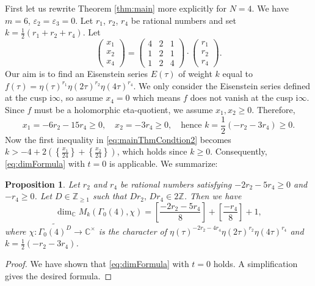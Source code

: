 \documentclass[12pt]{amsart}
\numberwithin{equation}{section}
\theoremstyle{plain}
\newtheorem{prop}[thm]{Proposition}
\theoremstyle{definition}
\theoremstyle{remark}
\newcommand\rmi{\mathrm{i}}
\newcommand\numZ{\mathbb{Z}}
\newcommand\numC{\mathbb{C}}
\newcommand\numgeq[2]{\mathbb{#1}_{\geq #2}}
\newcommand\Dcover[2]{\widetilde{#1^{#2}}}
\begin{document}
First let us rewrite Theorem \ref{thm:main} more explicitly for $N=4$. We have $m=6$, $\varepsilon_2=\varepsilon_3=0$. Let $r_1$, $r_2$, $r_4$ be rational numbers and set $k=\frac{1}{2}(r_1+r_2+r_4)$. Let
\begin{equation}
\label{eq:x1x2x4r1r2r4}
\begin{pmatrix}
x_1 \\ x_2 \\ x_4
\end{pmatrix}=
\begin{pmatrix}
4 & 2 & 1 \\
1 & 2 & 1\\
1 & 2 & 4
\end{pmatrix}\cdot
\begin{pmatrix}
r_1 \\ r_2 \\ r_4
\end{pmatrix}.
\end{equation}
Our aim is to find an Eisenstein series $E(\tau)$ of weight $k$ equal to $f(\tau)=\eta(\tau)^{r_1}\eta(2\tau)^{r_2}\eta(4\tau)^{r_4}$. We only consider the Eisenstein series defined at the cusp $\rmi\infty$, so assume $x_4=0$ which means $f$ does not vanish at the cusp $\rmi\infty$. Since $f$ must be a holomorphic eta-quotient, we assume $x_1,x_2\geq0$. Therefore,
\begin{equation*}
x_1=-6r_2-15r_4\geq0,\quad x_2=-3r_4\geq0,\quad\text{hence }k=\frac{1}{2}(-r_2-3r_4)\geq0.
\end{equation*}
Now the first inequality in \eqref{eq:mainThmCondtion2} becomes $k>-4+2\left(\left\{\frac{x_1}{24}\right\}+\left\{\frac{x_2}{24}\right\}\right)$, which holds since $k\geq0$. Consequently, \eqref{eq:dimFormula} with $t=0$ is applicable. We summarize:
\begin{prop}
\label{prop:level4x4zero}
Let $r_2$ and $r_4$ be rational numbers satisfying $-2r_2-5r_4\geq0$ and $-r_4\geq0$. Let $D\in\numgeq{Z}{1}$ such that $Dr_2,\,Dr_4\in2\numZ$. Then we have
\begin{equation*}
\dim_\numC M_k(\Gamma_0(4), \chi)=\left[\frac{-2r_2-5r_4}{8}\right]+\left[\frac{-r_4}{8}\right]+1,
\end{equation*}
where $\chi\colon\Dcover{\Gamma_0(4)}{D}\to\numC^\times$ is the character of $\eta(\tau)^{-2r_2-4r_4}\eta(2\tau)^{r_2}\eta(4\tau)^{r_4}$ and $k=\frac{1}{2}(-r_2-3r_4)$.
\end{prop}
\begin{proof}
We have shown that \eqref{eq:dimFormula} with $t=0$ holds. A simplification gives the desired formula.
\end{proof}
\end{document}
